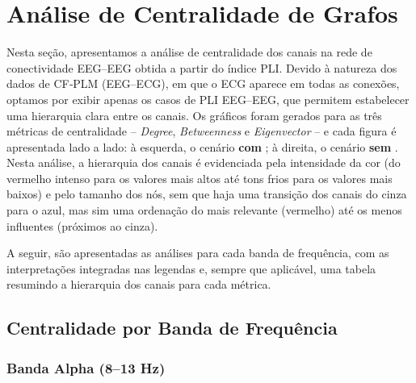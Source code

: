 \chapter{Análise de Centralidade de Grafos}
Nesta seção, apresentamos a análise de centralidade dos canais na rede de conectividade EEG–EEG obtida a partir do índice PLI. Devido à natureza dos dados de CF‐PLM (EEG–ECG), em que o ECG aparece em todas as conexões, optamos por exibir apenas os casos de PLI EEG–EEG, que permitem estabelecer uma hierarquia clara entre os canais. Os gráficos foram gerados para as três métricas de centralidade – \textit{Degree}, \textit{Betweenness} e \textit{Eigenvector} – e cada figura é apresentada lado a lado: à esquerda, o cenário \textbf{com }; à direita, o cenário \textbf{sem }. Nesta análise, a hierarquia dos canais é evidenciada pela intensidade da cor (do vermelho intenso para os valores mais altos até tons frios para os valores mais baixos) e pelo tamanho dos nós, sem que haja uma transição dos canais do cinza para o azul, mas sim uma ordenação do mais relevante (vermelho) até os menos influentes (próximos ao cinza).

A seguir, são apresentadas as análises para cada banda de frequência, com as interpretações integradas nas legendas e, sempre que aplicável, uma tabela resumindo a hierarquia dos canais para cada métrica.

\section{Centralidade por Banda de Frequência}
\subsection{Banda Alpha (8--13 Hz)}
